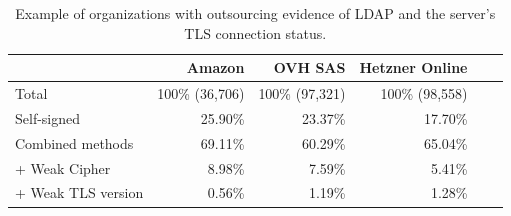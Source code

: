 \begin{table}[!ht]
\centering
\small
\begin{tabular}{lrrrrr}
\hline
      & \textbf{Amazon} & \textbf{OVH SAS} & \textbf{Hetzner Online} \\
\hline
Total & 100\% (36,706) & 100\% (97,321) & 100\% (98,558) \\
\hline
Self-signed & 25.90\%  & 23.37\% & 17.70\% \\
Combined methods & 69.11\% & 60.29\% & 65.04\% \\
\hline 
+ Weak Cipher & 8.98\% & 7.59\% & 5.41\% \\
+ Weak TLS version & 0.56\% & 1.19\% & 1.28\% \\
\hline 
\end{tabular}
\caption{Example of organizations with outsourcing evidence of LDAP and the server's TLS connection status.}
\label{tab:outsourcing_weak_top3}
\end{table}